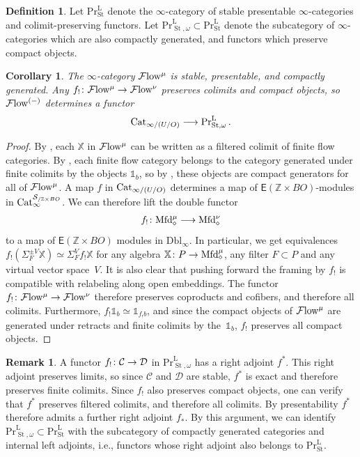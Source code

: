 \documentclass[10pt]{amsart}
\numberwithin{equation}{section}
\newtheorem{cor}[prop]{Corollary}
\theoremstyle{definition}
\newtheorem{definition}[prop]{Definition}
\newtheorem{rem}[prop]{Remark}
\DeclareMathOperator{\St}{St}
\renewcommand{\Pr}{\mathrm{Pr}}
\newcommand{\rL}{\mathrm{L}}
\newcommand{\PrLSt}{\Pr^{\rL}_{\St}}
\newcommand{\Flow}{\cF\mathrm{low}\vphantom{w}}
\newcommand{\Cat}{\mathrm{Cat}\vphantom{t}}
\newcommand{\Mfd}{\mathrm{Mfd}\vphantom{d}}
\newcommand{\bZ}{\mathbb{Z}}
\newcommand{\bX}{\mathbb{X}}
\newcommand{\bOne}{\mathbb{1}}
\newcommand{\cC}{\mathcal{C}}
\newcommand{\calD}{\mathcal{D}}
\newcommand{\cS}{\mathcal{S}}
\newcommand{\cF}{\mathcal{F}}
\newcommand{\sfE}{\mathsf{E}}
\newcommand{\Dbl}{\mathrm{Dbl}}
\renewcommand{\to}{\mathchoice{\longrightarrow}{\rightarrow}{}{}}
\begin{document}
\begin{definition}
	Let $\PrLSt$ denote the $\infty$-category of stable presentable $\infty$-categories and colimit-preserving functors. Let $\Pr^{\rL}_{\St,\omega}\subset \PrLSt$ denote the subcategory of $\infty$-categories which are also compactly generated, and functors which preserve compact objects.
\end{definition}
\begin{cor}\label{cor:flow_is_cg_pres}
	The $\infty$-category $\Flow^{\mu}$ is stable, presentable, and compactly generated.
	Any $f_!\colon \Flow^{\mu}\to \Flow^{\nu}$ preserves colimits and compact objects, so $\Flow^{(-)}$ determines a functor
	\begin{align*}
		\Cat_{\infty/ (U/O)} \to \Pr^{\rL}_{\St,\omega} \,.
	\end{align*}
\end{cor}
\begin{proof}
	By , each $\bX$ in $\Flow^{\mu}$ can be written as a filtered colimit of finite flow categories.
  By , each finite flow category belongs to the category generated under finite colimits by the objects $\bOne_{b}$, so by , these objects are compact generators for all of $\Flow^{\mu}$.
	A map $f$ in $\Cat_{\infty/(U/O)}$ determines a map of $\sfE(\bZ\times BO)$-modules in $\Cat_{\infty}^{\cS_{/\bZ\times BO}}$.
  We can therefore lift the double functor
	\begin{align*}
		f_{!} \colon \Mfd^{\mu}_{\diamond} \to \Mfd^{\nu}_{\diamond}
	\end{align*}
	to a map of $\sfE(\bZ\times BO)$ modules in $\Dbl_{\infty}$.
  In particular, we get equivalences $f_{!}( \Sigma^{\pm V}_{F} \bX) \simeq \Sigma^{V}_{F} f_{!}\bX$ for any algebra $\bX \colon P \to \Mfd^{\mu}_{\diamond}$, any filter $F\subset P$ and any virtual vector space~$V$.
  It is also clear that pushing forward the framing by $f_{!}$ is compatible with relabeling along open embeddings.
  The functor $f_{!}\colon \Flow^{\mu}\to \Flow^{\nu}$ therefore preserves coproducts and cofibers, and therefore all colimits.
  Furthermore, $f_{!}\bOne_{b} \simeq \bOne_{f_{!}b}$, and since the compact objects of $\Flow^{\mu}$ are generated under retracts and finite colimits by the~$\bOne_{b}$, $f_{!}$ preserves all compact objects.
\end{proof}

\begin{rem}\label{rem:strongly_cont}
	A functor $f_{!}\colon \cC \to \calD$ in $\Pr^{\rL}_{\St,\omega}$ has a right adjoint $f^{*}$.
  This right adjoint preserves limits, so since $\cC$ and $\calD$ are stable, $f^{*}$ is exact and therefore preserves finite colimits.
  Since $f_{!}$ also preserves compact objects, one can verify that $f^{*}$ preserves filtered colimits, and therefore all colimits.
  By presentability $f^{*}$ therefore admits a further right adjoint $f_{*}$.
  By this argument, we can identify $\Pr^{\rL}_{\St, \omega} \subset \PrLSt$ with the subcategory of compactly generated categories and internal left adjoints, i.e., functors whose right adjoint also belongs to $\PrLSt$.
\end{rem}
\end{document}
